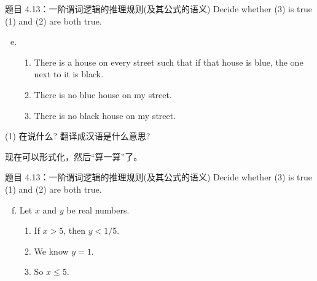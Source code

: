 \begin{frame}{}
  \begin{exampleblock}{题目 4.13：一阶谓词逻辑的推理规则(及其公式的语义)}
    Decide whether (3) is true  (1) and (2) are both true.

    \begin{enumerate}[(a)]
      \setcounter{enumi}{4}
      \item 
	\begin{enumerate}[(1)]
	  \item There is a house on every street such that if that house is blue,
	    the one next to it is black.
	  \item There is no blue house on my street.
	  \item There is no black house on my street.
	\end{enumerate}
    \end{enumerate}
  \end{exampleblock}

  \vspace{0.30cm}
  \centerline{(1) 在说什么? 翻译成汉语是什么意思?}

  \pause

  \pause
  \centerline{现在可以形式化，然后``算一算''了。}
\end{frame}

\begin{frame}{}
  \begin{exampleblock}{题目 4.13：一阶谓词逻辑的推理规则(及其公式的语义)}
    Decide whether (3) is true  (1) and (2) are both true.

    \begin{enumerate}[(a)]
      \setcounter{enumi}{5}
      \item Let $x$ and $y$ be real numbers.
	\begin{enumerate}[(1)]
	  \item If $x > 5$, then $y < 1/5$.
	  \item We know $y = 1$.
	  \item So $x \le 5$.
	\end{enumerate}
    \end{enumerate}
  \end{exampleblock}
\end{frame}

